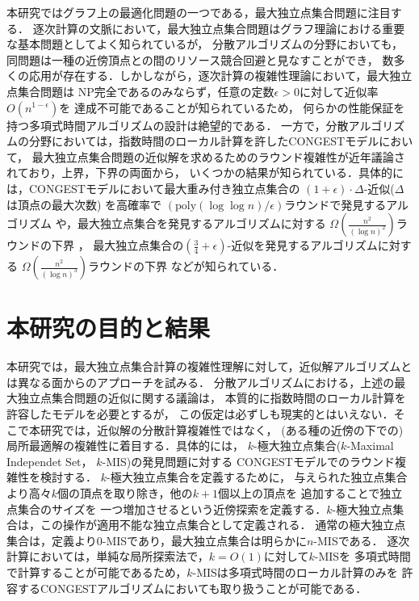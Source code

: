 \documentclass[12pt]{thesis}
\newcommand{\CONGEST}{\textsf{CONGEST}}
\theoremstyle{definition}
\begin{document}
本研究ではグラフ上の最適化問題の一つである，最大独立点集合問題に注目する．
逐次計算の文脈において，最大独立点集合問題はグラフ理論における重要な基本問題としてよく知られているが，
分散アルゴリズムの分野においても，同問題は一種の近傍頂点との間のリソース競合回避と見なすことができ，
数多くの応用が存在する．しかしながら，逐次計算の複雑性理論において，最大独立点集合問題は
NP完全であるのみならず，任意の定数$\epsilon > 0$に対して近似率$O(n^{1-\epsilon})$を
達成不可能であることが知られているため，
何らかの性能保証を持つ多項式時間アルゴリズムの設計は絶望的である\cite{haastad1999clique}．
一方で，分散アルゴリズムの分野においては，指数時間のローカル計算を許した{\CONGEST}モデルにおいて，
最大独立点集合問題の近似解を求めるためのラウンド複雑性が近年議論されており，上界，下界の両面から，
いくつかの結果が知られている．具体的には，{\CONGEST}モデルにおいて最大重み付き独立点集合の
$(1 + \epsilon) \cdot \Delta$-近似($\Delta$は頂点の最大次数) を高確率で
$\left(\mathrm{poly}(\log \log n)/\epsilon \right)$ラウンドで発見するアルゴリズム
\cite{kawarabayashi2019improved} や，最大独立点集合を発見するアルゴリズムに対する
$\Omega \left(\frac{n^{2}}{(\log n)^{2}}\right)$ラウンドの下界 \cite{censor2017quadratic}，
最大独立点集合の$(\frac{3}{4} + \epsilon)$-近似を発見するアルゴリズムに対する
$\Omega \left(\frac{n^{2}}{(\log n)^{3}}\right)$ラウンドの下界 \cite{efron2020beyond} などが知られている．

\section{本研究の目的と結果}
本研究では，最大独立点集合計算の複雑性理解に対して，近似解アルゴリズムとは異なる面からのアプローチを試みる．
分散アルゴリズムにおける，上述の最大独立点集合問題の近似に関する議論は，
本質的に指数時間のローカル計算を許容したモデルを必要とするが，
この仮定は必ずしも現実的とはいえない．そこで本研究では，近似解の分散計算複雑性ではなく，
(ある種の近傍の下での)局所最適解の複雑性に着目する．具体的には，
$k$-極大独立点集合($k$-Maximal Independet Set， $k$-MIS)の発見問題に対する
{\CONGEST}モデルでのラウンド複雑性を検討する\cite{bollobas1991generalised}．
$k$-極大独立点集合を定義するために，
与えられた独立点集合より高々$k$個の頂点を取り除き，他の$k+1$個以上の頂点を
追加することで独立点集合のサイズを
一つ増加させるという近傍探索を定義する．$k$-極大独立点集合は，この操作が適用不能な独立点集合として定義される．
通常の極大独立点集合は，定義より$0$-MISであり，最大独立点集合は明らかに$n$-MISである．
逐次計算においては，単純な局所探索法で，$k=O(1)$に対して$k$-MISを
多項式時間で計算することが可能であるため，$k$-MISは多項式時間のローカル計算のみを
許容する{\CONGEST}アルゴリズムにおいても取り扱うことが可能である．
\end{document}
